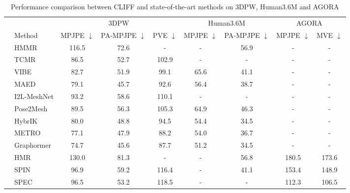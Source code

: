 \documentclass[runningheads]{llncs}
\begin{document}
\begin{table}[t]\scriptsize
	\centering
	\caption{Performance comparison between CLIFF and state-of-the-art methods on 3DPW, Human3.6M and AGORA}
	\label{table:sota}
	\begin{tabular}{clccccccc}
		\toprule
		\multicolumn{1}{l}{} &      & \multicolumn{3}{c}{3DPW}                                      & \multicolumn{2}{c}{Human3.6M}                & \multicolumn{2}{c}{AGORA}                   \\
		\cmidrule(lr){3-5}\cmidrule(lr){6-7}\cmidrule(lr){8-9}
		\multicolumn{1}{l}{} & Method          &
		\multicolumn{1}{c}{MPJPE $\downarrow$} & \multicolumn{1}{c}{PA-MPJPE $\downarrow$} & \multicolumn{1}{c}{PVE $\downarrow$} & \multicolumn{1}{c}{MPJPE $\downarrow$} & \multicolumn{1}{c}{PA-MPJPE $\downarrow$} & \multicolumn{1}{c}{MPJPE $\downarrow$} & \multicolumn{1}{c}{MVE $\downarrow$}  \\
		\midrule
		\multirow{4}{*}{\rotatebox{90}{video}}
		& HMMR \cite{kanazawa2019learning}	& 116.5 & 72.6   & -    & -    & 56.9   & -    & -     \\
		& TCMR \cite{choi2021beyond}		& 86.5 & 52.7   & 102.9 & -    & -      & -    & -     \\
		& VIBE \cite{kocabas2020vibe} 		& 82.7 & 51.9   & 99.1 & 65.6 & 41.1   & -    & -     \\
		& MAED \cite{wan2021encoder} 		& 79.1 & 45.7   & 92.6 & 56.4 & 38.7   & -    & -     \\
		\midrule
		\multirow{5}{*}{\rotatebox{90}{model-free}}
		& I2L-MeshNet \cite{moon2020i2l}     & 93.2 & 58.6   & 110.1 & -    & -      & -    & -     \\
		& Pose2Mesh \cite{choi2020pose2mesh}       & 89.5 & 56.3   & 105.3 & 64.9 & 46.3   & -    & -     \\
		& HybrIK \cite{li2021hybrik}         & 80.0 & 48.8   & 94.5 & 54.4 & 34.5   & -    & -     \\
		& METRO \cite{lin2021end}           & 77.1 & 47.9   & 88.2 & 54.0 & 36.7   & -    & -     \\
		& Graphormer \cite{lin2021mesh} & 74.7 & 45.6   & 87.7 & 51.2 & 34.5   & -    & -     \\
		\midrule
		\multirow{9}{*}{\rotatebox{90}{model-based}}
		& HMR \cite{kanazawa2018end}  & 130.0 & 81.3   & -    & -    & 56.8   & 180.5 & 173.6 \\
		& SPIN \cite{kolotouros2019learning} & 96.9 & 59.2   & 116.4 & -    & 41.1   & 153.4 & 148.9 \\
		& SPEC \cite{kocabas2021spec} & 96.5 & 53.2   & 118.5 & -    & -      & 112.3 & 106.5 \\

\end{tabular}
\end{table}
\end{document}
